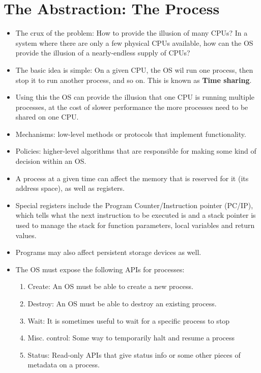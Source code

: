 \documentclass[11pt, a4paper]{article}
\theoremstyle{definition}
\theoremstyle{remark}
\newcommand{\chap}[2]{%
  \renewcommand{\thesection}{\arabic{section}}%
  \renewcommand{\theHsection}{chap.\arabic{section}}%
  \setcounter{section}{#1}\addtocounter{section}{-1}%
  \section{#2}}
\begin{document}
\newpage
\chap{4}{The Abstraction: The Process}
\begin{itemize}
  \item The crux of the problem: How to provide the illusion of many CPUs? In a system where there are only a few physical CPUs available, how can the OS provide the illusion of a nearly-endless supply of CPUs?
  \item The basic idea is simple: On a given CPU, the OS wil run one process, then stop it to run another process, and so on. This is known as \textbf{Time sharing}.
  \item Using this the OS can provide the illusion that one CPU is running multiple processes, at the cost of slower performance the more processes need to be shared on one CPU.
  \item Mechanisms: low-level methods or protocols that implement functionality.
  \item Policies: higher-level algorithms that are responsible for making some kind of decision within an OS. 
  \item A process at a given time can affect the memory that is reserved for it (its address space), as well as registers. 
  \item Special registers include the Program Counter/Instruction pointer (PC/IP), which tells what the next instruction to be executed is and a stack pointer is used to manage the stack for function parameters, local variables and return values. 
  \item Programs may also affect persistent storage devices as well. 
  \item The OS must expose the following APIs for processes:
  \begin{enumerate}
    \item Create: An OS must be able to create a new process. 
    \item Destroy: An OS must be able to destroy an existing process. 
    \item Wait: It is sometimes useful to wait for a specific process to stop 
    \item Misc. control: Some way to temporarily halt and resume a process 
    \item Status: Read-only APIs that give status info or some other pieces of metadata on a process.
  \end{enumerate}
\end{itemize}
\end{document}
